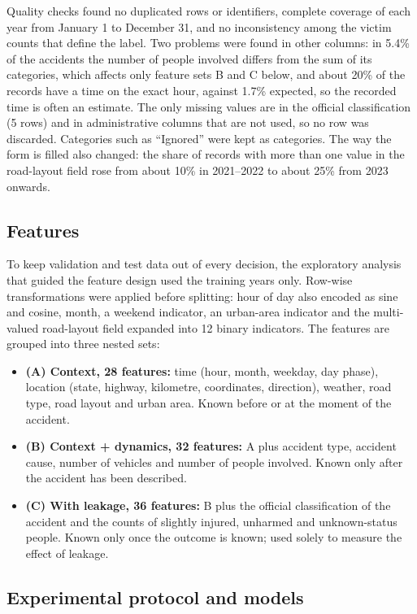 \documentclass[12pt]{article}
\begin{document}
Quality checks found no duplicated rows or identifiers, complete coverage of
each year from January 1 to December 31, and no inconsistency among the victim
counts that define the label. Two problems were found in other columns: in
5.4\% of the accidents the number of people involved differs from the sum of
its categories, which affects only feature sets B and C below, and about 20\%
of the records have a time on the exact hour, against 1.7\% expected, so the
recorded time is often an estimate. The only missing values are in the official
classification (5 rows) and in administrative columns that are not used, so no
row was discarded. Categories such as ``Ignored'' were kept as categories. The
way the form is filled also changed: the share of records with more than one
value in the road-layout field rose from about 10\% in 2021--2022 to about 25\%
from 2023 onwards.

\subsection{Features}

To keep validation and test data out of every decision, the exploratory
analysis that guided the feature design used the training years only.
Row-wise transformations were applied before splitting: hour of day also
encoded as sine and cosine, month, a weekend indicator, an urban-area indicator
and the multi-valued road-layout field expanded into 12 binary indicators. The
features are grouped into three nested sets:

\begin{itemize}
\item \textbf{(A) Context, 28 features:} time (hour, month, weekday, day
phase), location (state, highway, kilometre, coordinates, direction), weather,
road type, road layout and urban area. Known before or at the moment of the
accident.
\item \textbf{(B) Context + dynamics, 32 features:} A plus accident type,
accident cause, number of vehicles and number of people involved. Known only
after the accident has been described.
\item \textbf{(C) With leakage, 36 features:} B plus the official
classification of the accident and the counts of slightly injured, unharmed
and unknown-status people. Known only once the outcome is known; used solely
to measure the effect of leakage.
\end{itemize}

\subsection{Experimental protocol and models}
\end{document}
